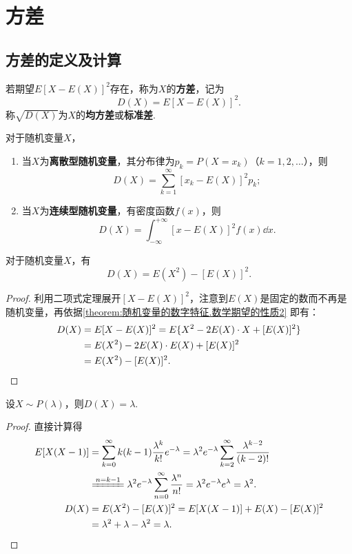 \section{方差}
\subsection{方差的定义及计算}
\begin{definition}
若期望\(E[X-E(X)]^2\)存在，称为\(X\)的\textbf{方差}，记为\[
D(X) = E[X-E(X)]^2.
\]称\(\sqrt{D(X)}\)为\(X\)的\textbf{均方差}或\textbf{标准差}.
\end{definition}

\begin{theorem}
对于随机变量\(X\)，%
\begin{enumerate}
\item 当\(X\)为\textbf{离散型随机变量}，其分布律为\(p_k = P(X=x_k)\)（\(k=1,2,\dotsc\)），则\[
D(X) = \sum\limits_{k=1}^\infty [x_k - E(X)]^2 p_k;
\]
\item 当\(X\)为\textbf{连续型随机变量}，有密度函数\(f(x)\)，则\[
D(X) = \int_{-\infty}^{+\infty} [x - E(X)]^2 f(x) \dd{x}.
\]
\end{enumerate}
\end{theorem}

\begin{corollary}\label{theorem:随机变量的数字特征.常用的方差的计算式}
对于随机变量\(X\)，有\begin{equation}
D(X) = E(X^2) - [E(X)]^2.
\end{equation}
\begin{proof}
利用二项式定理展开\([X-E(X)]^2\)，注意到\(E(X)\)是固定的数而不再是随机变量，再依据\cref{theorem:随机变量的数字特征.数学期望的性质2} 即有：
\begin{align*}
D(X) &= E[X-E(X)]^2
= E\{X^2 - 2E(X) \cdot X + [E(X)]^2\} \\
&= E(X^2) - 2E(X) \cdot E(X) + [E(X)]^2 \\
&= E(X^2) - [E(X)]^2.
\qedhere
\end{align*}
\end{proof}
\end{corollary}

\begin{theorem}
设\(X \sim P(\lambda)\)，则\(D(X) = \lambda\).
\begin{proof}
直接计算得
\begin{align*}
E[X(X-1)]
&= \sum\limits_{k=0}^\infty {k(k-1) \frac{\lambda^k}{k!} e^{-\lambda}}
= \lambda^2 e^{-\lambda} \sum\limits_{k=2}^\infty {\frac{\lambda^{k-2}}{(k-2)!}} \\
&\xlongequal{n=k-1} \lambda^2 e^{-\lambda} \sum\limits_{n=0}^\infty {\frac{\lambda^n}{n!}}
= \lambda^2 e^{-\lambda} e^{\lambda} = \lambda^2. \\
D(X)
&= E(X^2) - [E(X)]^2
= E[X(X-1)] + E(X) - [E(X)]^2 \\
&= \lambda^2 + \lambda - \lambda^2 = \lambda.
\qedhere
\end{align*}
\end{proof}
\end{theorem}

